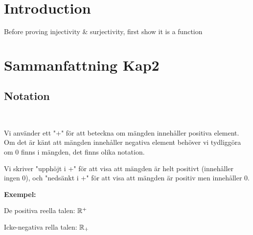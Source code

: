 \section{Introduction}\par
\noindent Before proving injectivity \& surjectivity, first show it is a function 
\par\bigskip
\section{Sammanfattning Kap2}\par
\subsection{Notation}\hfill\\\par
\noindent Vi använder ett "$+$" för att beteckna om mängden innehåller positiva element. Om det är känt att mängden innehåller negativa element behöver vi tydliggöra om 0 finns i mängden, det finns olika notation.
\par\bigskip
\noindent Vi skriver "upphöjt i +" för att visa att mängden är helt positivt (innehåller ingen 0), och "nedsänkt i +" för att visa att mängden är positiv men innehåller 0.
\par\bigskip
\noindent\textbf{Exempel:}\par
\noindent De positiva reella talen: $\mathbb{R}^+$\par
\noindent Icke-negativa rella talen: $\mathbb{R}_+$
\par\bigskip
